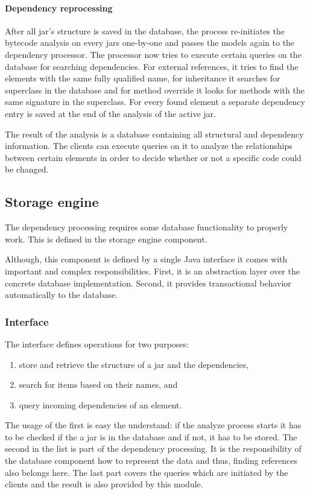 \paragraph{Dependency reprocessing} 
After all jar's  structure is saved in the database, the process re-initiates
the bytecode analysis on every jars one-by-one and passes the models again to
the dependency processor. The processor now tries to execute certain queries on
the database for searching dependencies. For external references, it tries to
find the elements with the same fully qualified name, for inheritance it searches for
superclass in the database and for method override it looks for methods with
the same signature in the superclass. For every found element  a separate dependency
entry is saved at the end of the analysis of the active jar.

The result of the analysis is a database containing all  structural
and dependency information. The clients can execute queries on it to analyze the
relationships between certain elements in order to decide whether or not a
specific code could be changed.
 
 
\subsection{Storage engine} 
The dependency processing requires some database functionality to 
properly work. This is defined in the storage engine component.

Although, this component is defined by a single Java interface it comes with
important and complex responsibilities. First, it is an abstraction layer over
the concrete database implementation. Second, it provides transactional behavior
automatically to the database. 

\subsubsection{Interface}
The interface defines operations for two purposes: 
\begin{enumerate}
  \item store and retrieve the structure of a jar and the dependencies,
  \item search for items based on their names, and
  \item query incoming dependencies of an element.
\end{enumerate}

The usage of the first is easy the understand: if the analyze process starts it
has to be checked if the a jar is in the database and if not, it has to be
stored. The second in the list is part of the dependency processing. It is the
responsibility of the database component how to represent the data and thus,
finding references also belongs here. The last part covers the queries which are
initiated by the clients and the result is also provided by this module.


